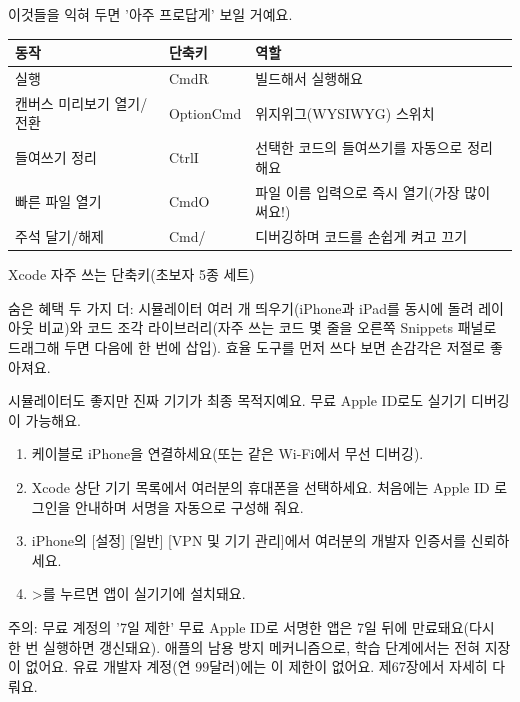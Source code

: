 

이것들을 익혀 두면 '아주 프로답게' 보일 거예요.

\begin{center}
\begin{tabularx}{\linewidth}{|X|X|X|}
\hline
\textbf{동작} & \textbf{단축키} & \textbf{역할} \tabularnewline
\hline
실행 & CmdR & 빌드해서 실행해요 \tabularnewline
캔버스 미리보기 열기/전환 & OptionCmd & 위지위그(WYSIWYG) 스위치 \tabularnewline
들여쓰기 정리 & CtrlI & 선택한 코드의 들여쓰기를 자동으로 정리해요 \tabularnewline
빠른 파일 열기 & CmdO & 파일 이름 입력으로 즉시 열기(가장 많이 써요!) \tabularnewline
주석 달기/해제 & Cmd/ & 디버깅하며 코드를 손쉽게 켜고 끄기 \tabularnewline
\hline
\end{tabularx}
\end{center}

\begin{center}\small\color{gray}Xcode 자주 쓰는 단축키(초보자 5종 세트)\end{center}

숨은 혜택 두 가지 더: 시뮬레이터 여러 개 띄우기(iPhone과 iPad를 동시에 돌려 레이아웃 비교)와 코드 조각 라이브러리(자주 쓰는 코드 몇 줄을 오른쪽 Snippets 패널로 드래그해 두면 다음에 한 번에 삽입). 효율 도구를 먼저 쓰다 보면 손감각은 저절로 좋아져요.


시뮬레이터도 좋지만 진짜 기기가 최종 목적지예요. 무료 Apple ID로도 실기기 디버깅이 가능해요.

\begin{enumerate}
  \item 케이블로 iPhone을 연결하세요(또는 같은 Wi-Fi에서 무선 디버깅).
  \item Xcode 상단 기기 목록에서 여러분의 휴대폰을 선택하세요. 처음에는 Apple ID 로그인을 안내하며 서명을 자동으로 구성해 줘요.
  \item iPhone의 [설정] [일반] [VPN 및 기기 관리]에서 여러분의 개발자 인증서를 신뢰하세요.
  \item >를 누르면 앱이 실기기에 설치돼요.
\end{enumerate}

\begin{tcbwarn}{주의: 무료 계정의 '7일 제한'}
무료 Apple ID로 서명한 앱은 7일 뒤에 만료돼요(다시 한 번 실행하면 갱신돼요). 애플의 남용 방지 메커니즘으로, 학습 단계에서는 전혀 지장이 없어요. 유료 개발자 계정(연 99달러)에는 이 제한이 없어요. 제67장에서 자세히 다뤄요.

\end{tcbwarn}

